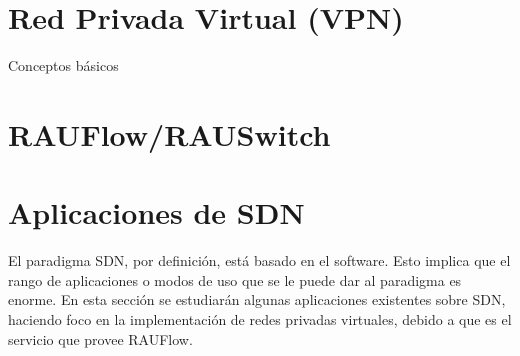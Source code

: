 \section{Red Privada Virtual (VPN)}
Conceptos básicos

\section{RAUFlow/RAUSwitch}

\section{Aplicaciones de SDN}
El paradigma SDN, por definición, está basado en el software. Esto implica que el rango de aplicaciones o modos de uso que se le puede dar al paradigma es enorme. En esta sección se estudiarán algunas aplicaciones existentes sobre SDN, haciendo foco en la implementación de redes privadas virtuales, debido a que es el servicio que provee RAUFlow.
